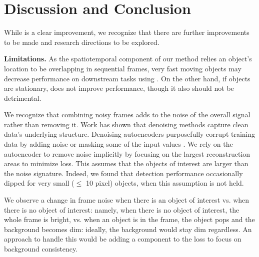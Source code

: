 \section{Discussion and Conclusion}
While \NAME{} is a clear improvement, we recognize that there are further improvements to be made and research directions to be explored.
\label{sec:discussion}

\noindent{}\textbf{Limitations.}\label{sec:limitations}
As the spatiotemporal component of our method relies an object's location to be overlapping in sequential frames, very fast moving objects may decrease performance on downstream tasks using \NAME{}. On the other hand, if objects are stationary, \NAME{} does not improve performance, though it also should not be detrimental.

We recognize that combining noisy frames adds to the noise of the overall signal rather than removing it. Work \cite{bengio2013denoisingautoencoders} has shown that denoising methods capture clean data's underlying structure. Denoising autoencoders purposefully corrupt training data by adding noise or masking some of the input values \cite{tong2022videomae, he2022MAE}. We rely on the autoencoder to remove noise implicitly by focusing on the largest reconstruction areas to minimize loss. This assumes that the objects of interest are larger than the noise signature. Indeed, we found that detection performance occasionally dipped for very small (\eg $\leq$ 10 pixel) objects, when this assumption is not held.

We observe a change in frame noise when there is an object of interest vs. when there is no object of interest: namely, when there is no object of interest, the whole frame is bright, vs. when an object is in the frame, the object pops and the background becomes dim: ideally, the background would stay dim regardless. An approach to handle this would be adding a component to the loss to focus on background consistency. 

